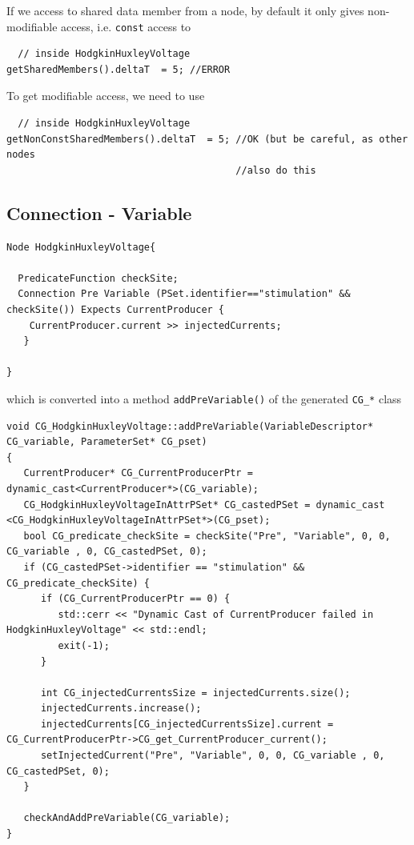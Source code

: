 If we access to shared data member from a node, by default it only gives
non-modifiable access, i.e. \verb!const! access to
\begin{verbatim}
  // inside HodgkinHuxleyVoltage
getSharedMembers().deltaT  = 5; //ERROR
\end{verbatim}
To get modifiable access, we need to use 
\begin{verbatim}
  // inside HodgkinHuxleyVoltage
getNonConstSharedMembers().deltaT  = 5; //OK (but be careful, as other nodes
                                        //also do this
\end{verbatim}


\subsection{Connection - Variable}

\begin{verbatim}
Node HodgkinHuxleyVoltage{

  PredicateFunction checkSite;
  Connection Pre Variable (PSet.identifier=="stimulation" && checkSite()) Expects CurrentProducer {
    CurrentProducer.current >> injectedCurrents;
   }

}
\end{verbatim}

which is converted into a method \verb!addPreVariable()! of the generated
\verb!CG_*! class
\begin{verbatim}
void CG_HodgkinHuxleyVoltage::addPreVariable(VariableDescriptor* CG_variable, ParameterSet* CG_pset) 
{
   CurrentProducer* CG_CurrentProducerPtr = dynamic_cast<CurrentProducer*>(CG_variable);
   CG_HodgkinHuxleyVoltageInAttrPSet* CG_castedPSet = dynamic_cast <CG_HodgkinHuxleyVoltageInAttrPSet*>(CG_pset);
   bool CG_predicate_checkSite = checkSite("Pre", "Variable", 0, 0, CG_variable , 0, CG_castedPSet, 0);
   if (CG_castedPSet->identifier == "stimulation" && CG_predicate_checkSite) {
      if (CG_CurrentProducerPtr == 0) {
         std::cerr << "Dynamic Cast of CurrentProducer failed in HodgkinHuxleyVoltage" << std::endl;
         exit(-1);
      }

      int CG_injectedCurrentsSize = injectedCurrents.size();
      injectedCurrents.increase();
      injectedCurrents[CG_injectedCurrentsSize].current = CG_CurrentProducerPtr->CG_get_CurrentProducer_current();
      setInjectedCurrent("Pre", "Variable", 0, 0, CG_variable , 0, CG_castedPSet, 0);
   }

   checkAndAddPreVariable(CG_variable);
}
\end{verbatim}

